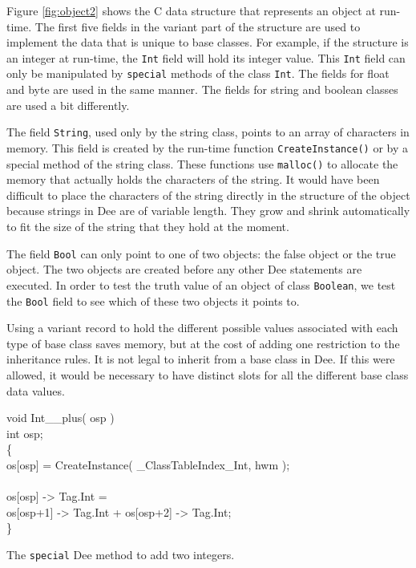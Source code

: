 Figure \ref{fig:object2} shows the C data structure that represents an
object at run-time.  The first five fields in the variant part of the
structure are used to implement the data that is unique to base
classes.  For example, if the structure is an integer at run-time, the
{\tt Int} field will hold its integer value.  This {\tt Int} field can
only be manipulated by {\tt special} methods of the class {\tt Int}.
The fields for float and byte are used in the same manner.  The fields
for string and boolean classes are used a bit differently.  

The field {\tt String}, used only by the string class, points to an
array of characters in memory.  This field is created by the run-time
function {\tt CreateInstance()} or by a special method of the string
class.  These functions use {\tt malloc()} to allocate the memory
that actually holds the characters of the string.  It would have been
difficult to place the characters of the string directly in the
structure of the object because strings in Dee are of variable length.
They grow and shrink automatically to fit the size of the string that
they hold at the moment.

The field {\tt Bool} can only point to one of two objects: the false
object or the true object.  The two objects are created before any
other Dee statements are executed.  In order to test the truth value
of an object of class {\tt Boolean}, we test the {\tt Bool} field to
see which of these two objects it points to.

Using a variant record to hold the different possible values
associated with each type of base class saves memory, but at the cost
of adding one restriction to the inheritance rules.  It is not legal
to inherit from a base class in Dee.  If this were allowed, it would
be necessary to have distinct slots for all the different base class
data values.

\begin{shortfigure}
\begin{prog}
\>    void Int\_\_plus( osp )         \\
\>\>      int osp;                    \\
\>    \{                              \\
\>\>      os[osp] = CreateInstance( \_ClassTableIndex\_Int, hwm ); \\
\>\>      \\
\>\>      os[osp] -> Tag.Int =        \\
\>\>\>	     os[osp+1] -> Tag.Int + os[osp+2] -> Tag.Int; \\
\>    \}  
\end{prog}
\caption{The {\tt special} Dee method to add two integers.}
\label{fig:plus}
\end{shortfigure}

